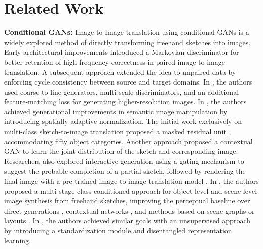 \section{Related Work}
\label{sec:related_work}

\textbf{Conditional GANs:} Image-to-Image translation using conditional GANs is a widely explored method of directly transforming freehand sketches into images. Early architectural improvements introduced a Markovian discriminator \cite{isola2017image} for better retention of high-frequency correctness in paired image-to-image translation. A subsequent approach \cite{zhu2017unpaired} extended the idea to unpaired data by enforcing cycle consistency between source and target domains. In \cite{wang2018high}, the authors used coarse-to-fine generators, multi-scale discriminators, and an additional feature-matching loss for generating higher-resolution images. In \cite{park2019semantic}, the authors achieved generational improvements in semantic image manipulation by introducing spatially-adaptive normalization. The initial work exclusively on multi-class sketch-to-image translation proposed a masked residual unit \cite{chen2018sketchygan}, accommodating fifty object categories. Another approach proposed a contextual GAN \cite{lu2018image} to learn the joint distribution of the sketch and corresponding image. Researchers also explored interactive generation \cite{ghosh2019interactive} using a gating mechanism to suggest the probable completion of a partial sketch, followed by rendering the final image with a pre-trained image-to-image translation model \cite{wang2018high}. In \cite{gao2020sketchycoco}, the authors proposed a multi-stage class-conditioned approach for object-level and scene-level image synthesis from freehand sketches, improving the perceptual baseline over direct generations \cite{isola2017image}, contextual networks \cite{lu2018image}, and methods based on scene graphs \cite{ashual2019specifying,johnson2018image} or layouts \cite{zhao2019image}. In \cite{wang2022unsupervised}, the authors achieved similar goals with an unsupervised approach by introducing a standardization module and disentangled representation learning.

\vspace{1.0em}

